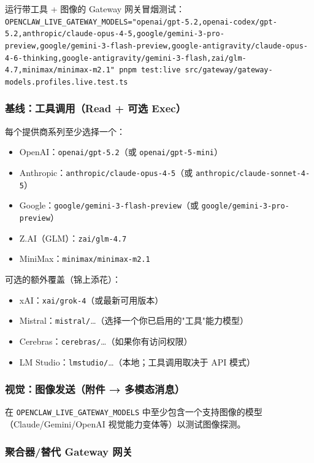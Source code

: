 运行带工具 + 图像的 Gateway 网关冒烟测试：
\texttt{OPENCLAW\_LIVE\_GATEWAY\_MODELS="openai/gpt-5.2,openai-codex/gpt-5.2,anthropic/claude-opus-4-5,google/gemini-3-pro-preview,google/gemini-3-flash-preview,google-antigravity/claude-opus-4-6-thinking,google-antigravity/gemini-3-flash,zai/glm-4.7,minimax/minimax-m2.1" pnpm test:live src/gateway/gateway-models.profiles.live.test.ts}

\subsubsection{基线：工具调用（Read + 可选 Exec）}


每个提供商系列至少选择一个：

\begin{itemize}
  \item OpenAI：\texttt{openai/gpt-5.2}（或 \texttt{openai/gpt-5-mini}）
  \item Anthropic：\texttt{anthropic/claude-opus-4-5}（或 \texttt{anthropic/claude-sonnet-4-5}）
  \item Google：\texttt{google/gemini-3-flash-preview}（或 \texttt{google/gemini-3-pro-preview}）
  \item Z.AI（GLM）：\texttt{zai/glm-4.7}
  \item MiniMax：\texttt{minimax/minimax-m2.1}
\end{itemize}


可选的额外覆盖（锦上添花）：

\begin{itemize}
  \item xAI：\texttt{xai/grok-4}（或最新可用版本）
  \item Mistral：\texttt{mistral/}…（选择一个你已启用的"工具"能力模型）
  \item Cerebras：\texttt{cerebras/}…（如果你有访问权限）
  \item LM Studio：\texttt{lmstudio/}…（本地；工具调用取决于 API 模式）
\end{itemize}


\subsubsection{视觉：图像发送（附件 → 多模态消息）}


在 \texttt{OPENCLAW\_LIVE\_GATEWAY\_MODELS} 中至少包含一个支持图像的模型（Claude/Gemini/OpenAI 视觉能力变体等）以测试图像探测。

\subsubsection{聚合器/替代 Gateway 网关}


